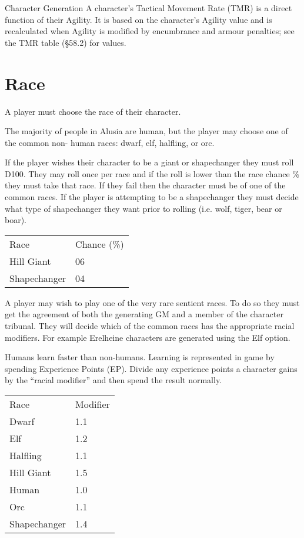 \begin{Chapter}{Character Generation}
A character’s Tactical Movement Rate (TMR) is a direct function of
their Agility.  It is based on the character’s Agility value and is
recalculated when Agility is modified by encumbrance and armour
penalties; see the TMR table (§58.2) for values.

\section{Race}

A player must choose the race of their character.

The majority of people in Alusia are human, but the player may choose
one of the common non- human races: dwarf, elf, halfling, or orc.

If the player wishes their character to be a giant or shapechanger
they must roll D100.  They may roll once per race and if the roll is
lower than the race chance \% they must take that race. If they fail
then the character must be of one of the common races.  If the player
is attempting to be a shapechanger they must decide what type of
shapechanger they want prior to rolling (i.e. wolf, tiger, bear or
boar).

\begin{tabularx}{\columnwidth}{XX}
Race		& Chance (\%) \\
Hill Giant	& 06 \\
Shapechanger	& 04 \\
\end{tabularx}

A player may wish to play one of the very rare sentient races.  To do
so they must get the agreement of both the generating GM and a member
of the character tribunal.  They will decide which of the common races
has the appropriate racial modifiers.  For example Erelheine
characters are generated using the Elf option.

Humans learn faster than non-humans. Learning is represented in game
by spending Experience Points (EP).  Divide any experience points a
character gains by the “racial modifier” and then spend the result
normally.

\begin{tabularx}{\columnwidth}{XX}
Race		& Modifier \\
Dwarf		& 1.1 \\
Elf		& 1.2 \\
Halfling	& 1.1 \\
Hill Giant	& 1.5 \\
Human		& 1.0 \\
Orc		& 1.1 \\
Shapechanger	& 1.4 \\
\end{tabularx}


\end{Chapter}
